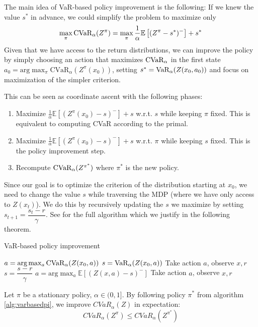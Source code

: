 The main idea of VaR-based policy improvement is the following: If we knew the value $s^*$ in advance, we could simplify the problem to maximize only
\begin{equation}\label{eqn:varbasedgoal}
\max_\pi \text{CVaR}_\alpha(Z^\pi) = \max_\pi \dfrac{1}{\alpha}\mathbb{E}
\left[ (Z^\pi-s^*)^-\right] + s^*
\end{equation}
Given that we have access to the return distributions, we can improve the policy by simply choosing an action that maximizes $\text{CVaR}_\alpha$ in the first state $a_0 = \text{arg}\max_\pi\text{CVaR}_\alpha(Z^\pi(x_0))$, setting $s^* = \text{VaR}_\alpha(Z(x_0, a_0))$ and focus on maximization of the simpler criterion.

This can be seen as coordinate ascent with the following phases:
\begin{enumerate}
\item Maximize $\frac{1}{\alpha}\mathbb{E}\left[ (Z^\pi(x_0)-s)^-\right] + s$ w.r.t. $s$ while keeping $\pi$ fixed. This is equivalent to computing CVaR according to the primal.
\item Maximize $\frac{1}{\alpha}\mathbb{E}\left[ (Z^\pi(x_0)-s)^-\right] + s$ w.r.t. $\pi$ while keeping $s$ fixed. This is the policy improvement step.
\item Recompute $\text{CVaR}_\alpha (Z^{\pi^*})$ where $\pi^*$ is the new policy.
\end{enumerate}
Since our goal is to optimize the criterion of the distribution starting at $x_0$, we need to change the value $s$ while traversing the MDP (where we have only access to $Z(x_t)$). We do this by recursively updating the $s$ we maximize by setting $s_{t+1} = \dfrac{s_t - r}{\gamma}$. See  for the full algorithm which we justify in the following theorem.

\begin{algorithm}
\caption{VaR-based policy improvement}
\label{alg:varbasedpi}
\begin{algorithmic}
    \STATE $a = \text{arg}\max_a \text{CVaR}_\alpha(Z(x_0, a))$
    \STATE $s = \text{VaR}_\alpha(Z(x_0, a))$
    \STATE Take action $a$, observe $x, r$
    	\STATE $s = \dfrac{s-r}{\gamma}$
    	\STATE $a = \text{arg}\max_a \mathbb{E}\left[(Z(x, a)-s)^- \right]$
    	\STATE Take action $a$, observe $x, r$
   	\ENDWHILE
\end{algorithmic}
\end{algorithm}

\begin{theorem}
Let $\pi$ be a stationary policy, $\alpha \in (0, 1]$. 
By following policy $\pi^*$ from algorithm \ref{alg:varbasedpi}, we improve $CVaR_\alpha(Z)$ in expectation:
$$CVaR_\alpha(Z^\pi) \le CVaR_\alpha(Z^{\pi^*})$$
%
%

\end{theorem}

